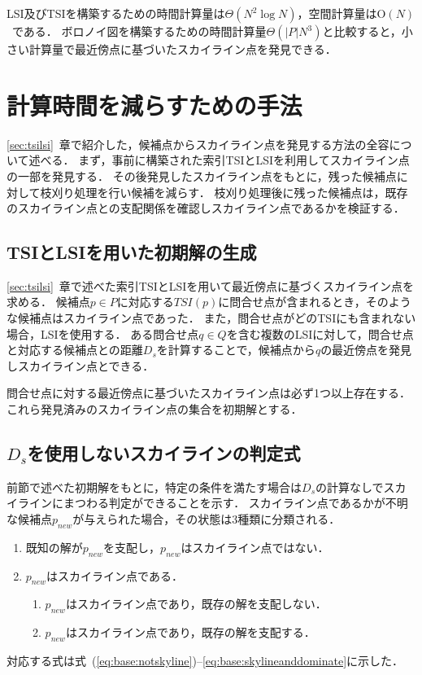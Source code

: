 \documentclass{fit}
\theoremstyle{definition}
\newcommand{\Sec}[1]{#1~章}
\newcommand{\Eq}[1]{式~(#1)}
\begin{document}
LSI及びTSIを構築するための時間計算量は$\Theta (N^2 \log N)$，空間計算量は$\mathrm{O}(N)$ ~\cite{vldb:shahabi2008}である．
ボロノイ図を構築するための時間計算量$\Theta (|P|N^3)$と比較すると，小さい計算量で最近傍点に基づいたスカイライン点を発見できる．

\section{計算時間を減らすための手法}\label{sec:3dtinskyline}
\Sec{\ref{sec:tsilsi}}で紹介した，候補点からスカイライン点を発見する方法の全容について述べる．
まず，事前に構築された索引TSIとLSIを利用してスカイライン点の一部を発見する．
その後発見したスカイライン点をもとに，残った候補点に対して枝刈り処理を行い候補を減らす．
枝刈り処理後に残った候補点は，既存のスカイライン点との支配関係を確認しスカイライン点であるかを検証する．

\subsection{TSIとLSIを用いた初期解の生成}\label{subsec:createtsilsi}
\Sec{\ref{sec:tsilsi}}で述べた索引TSIとLSIを用いて最近傍点に基づくスカイライン点を求める．
候補点$p \in P$に対応する$TSI(p)$に問合せ点が含まれるとき，そのような候補点はスカイライン点であった．
また，問合せ点がどのTSIにも含まれない場合，LSIを使用する．
ある問合せ点$q \in Q$を含む複数のLSIに対して，問合せ点と対応する候補点との距離$D_s$を計算することで，候補点から$q$の最近傍点を発見しスカイライン点とできる．

問合せ点に対する最近傍点に基づいたスカイライン点は必ず1つ以上存在する．
これら発見済みのスカイライン点の集合を初期解とする．

\subsection{$D_s$を使用しないスカイラインの判定式}\label{subsec:no_ds_formulas}

前節で述べた初期解をもとに，特定の条件を満たす場合は$D_s$の計算なしでスカイラインにまつわる判定ができることを示す．
スカイライン点であるかが不明な候補点$p_{new}$が与えられた場合，その状態は3種類に分類される．
\begin{enumerate}
  \item 既知の解が$p_{new}$を支配し，$p_{new}$はスカイライン点ではない．
  \item $p_{new}$はスカイライン点である．
  \begin{enumerate}
    \item $p_{new}$はスカイライン点であり，既存の解を支配しない．
    \item $p_{new}$はスカイライン点であり，既存の解を支配する．
  \end{enumerate}
\end{enumerate}
対応する式は\Eq{\ref{eq:base:notskyline}}--\eqref{eq:base:skylineanddominate}に示した．
\end{document}
